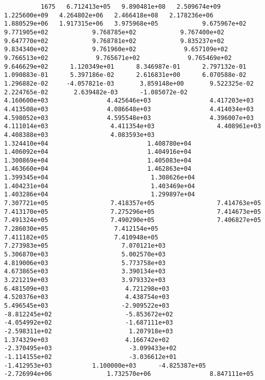 \documentclass{article}
\begin{document}
{\tiny 
\begin{verbatim}
          1675   6.712413e+05   9.890481e+08   2.509674e+09   1.225600e+09   4.264802e+06   2.466418e+08   2.178236e+06   1.880529e+06   1.917315e+06   3.975968e+05            9.675967e+02            9.771905e+02            9.768785e+02            9.767400e+02            9.647770e+02            9.768781e+02            9.835237e+02            9.834340e+02            9.761960e+02             9.657109e+02             9.766513e+02             9.765671e+02             9.765469e+02             9.646629e+02      1.120349e+01      8.346987e-01      2.797132e-01      1.090883e-01      5.397186e-02      2.616831e+00      6.070588e-02      1.296882e-02     -4.057821e-03       3.859148e+00       9.522325e-02       2.224765e-02       2.639482e-03      -1.085072e-02                4.160600e+03                4.425646e+03                4.417203e+03                4.413508e+03                4.086648e+03                4.414034e+03                4.598052e+03                4.595548e+03                4.396007e+03                 4.111014e+03                 4.411354e+03                 4.408961e+03                 4.408388e+03                 4.083593e+03                           1.324410e+04                           1.408780e+04                           1.406092e+04                           1.404916e+04                           1.300869e+04                           1.405083e+04                           1.463660e+04                           1.462863e+04                           1.399345e+04                            1.308626e+04                            1.404231e+04                            1.403469e+04                            1.403286e+04                            1.299897e+04                 7.307721e+05                 7.418357e+05                 7.414763e+05                 7.413170e+05                 7.275296e+05                 7.414673e+05                 7.491324e+05                 7.490290e+05                 7.406827e+05                  7.286030e+05                  7.412154e+05                  7.411182e+05                  7.410948e+05                  7.273983e+05                    7.070121e+03                    5.306870e+03                    5.002570e+03                    4.819006e+03                    5.773758e+03                    4.673865e+03                    3.390134e+03                    3.221219e+03                    3.979332e+03                     6.481509e+03                     4.721298e+03                     4.520376e+03                     4.438754e+03                     5.496545e+03                    -2.909522e+03                    -8.812245e+02                    -5.853672e+02                    -4.054992e+02                    -1.687111e+03                    -2.598311e+02                     1.207918e+03                     1.374329e+03                     4.166742e+02                     -2.370495e+03                     -3.099433e+02                     -1.114155e+02                     -3.036612e+01                     -1.412953e+03           1.100000e+03      -4.825387e+05                         -2.726994e+06               1.732570e+06                8.847111e+05 

\end{verbatim}}
\end{document}
